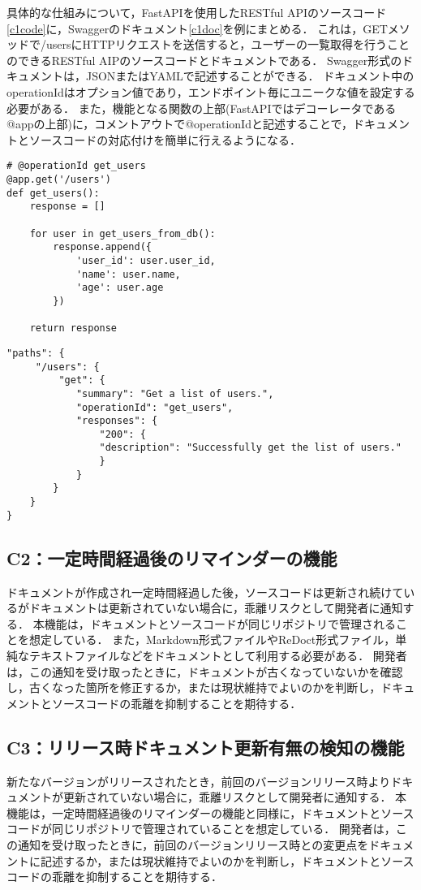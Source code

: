 具体的な仕組みについて，FastAPIを使用したRESTful APIのソースコード\ref{c1code}に，Swaggerのドキュメント\ref{c1doc}を例にまとめる．
これは，GETメソッドで/usersにHTTPリクエストを送信すると，ユーザーの一覧取得を行うことのできるRESTful AIPのソースコードとドキュメントである．
Swagger形式のドキュメントは，JSONまたはYAMLで記述することができる．
ドキュメント中のoperationIdはオプション値であり，エンドポイント毎にユニークな値を設定する必要がある．
また，機能となる関数の上部(FastAPIではデコーレータである@appの上部)に，コメントアウトで@operationIdと記述することで，ドキュメントとソースコードの対応付けを簡単に行えるようになる．

\begin{lstlisting}[caption=RESTful API, label=c1code]
# @operationId get_users
@app.get('/users')
def get_users():
    response = []

    for user in get_users_from_db():
        response.append({
            'user_id': user.user_id,
            'name': user.name,
            'age': user.age
        })

    return response
\end{lstlisting}


\begin{lstlisting}[caption=Swagger,label=c1doc]
"paths": {
     "/users": {
         "get": {
            "summary": "Get a list of users.",
            "operationId": "get_users",
            "responses": {
                "200": {
                "description": "Successfully get the list of users."
                }
            }
        }
    }
}
\end{lstlisting}

\subsection{C2：一定時間経過後のリマインダーの機能}
ドキュメントが作成され一定時間経過した後，ソースコードは更新され続けているがドキュメントは更新されていない場合に，乖離リスクとして開発者に通知する．
本機能は，ドキュメントとソースコードが同じリポジトリで管理されることを想定している．
また，Markdown形式ファイルやReDoct形式ファイル，単純なテキストファイルなどをドキュメントとして利用する必要がある．
開発者は，この通知を受け取ったときに，ドキュメントが古くなっていないかを確認し，古くなった箇所を修正するか，または現状維持でよいのかを判断し，ドキュメントとソースコードの乖離を抑制することを期待する．

\subsection{C3：リリース時ドキュメント更新有無の検知の機能}
新たなバージョンがリリースされたとき，前回のバージョンリリース時よりドキュメントが更新されていない場合に，乖離リスクとして開発者に通知する．
本機能は，一定時間経過後のリマインダーの機能と同様に，ドキュメントとソースコードが同じリポジトリで管理されていることを想定している．
開発者は，この通知を受け取ったときに，前回のバージョンリリース時との変更点をドキュメントに記述するか，または現状維持でよいのかを判断し，ドキュメントとソースコードの乖離を抑制することを期待する．

